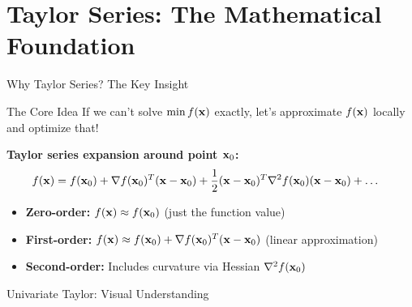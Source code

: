 \documentclass[usenames,dvipsnames]{beamer}
\begin{document}
  \section{Taylor Series: The Mathematical Foundation}

  \begin{frame}{Why Taylor Series? The Key Insight}
    \begin{definitionbox}{The Core Idea}
    If we can't solve $\min f(\mathbf{x})$ exactly, let's approximate $f(\mathbf{x})$ locally and optimize that!
    \end{definitionbox}
    
    \pause
    \textbf{Taylor series expansion around point $\mathbf{x}_0$:}
    \begin{align}
        f(\mathbf{x}) &= f(\mathbf{x}_0) + \nabla f(\mathbf{x}_0)^T(\mathbf{x}-\mathbf{x}_0) + \frac{1}{2}(\mathbf{x}-\mathbf{x}_0)^T\nabla^2 f(\mathbf{x}_0)(\mathbf{x}-\mathbf{x}_0) + \ldots
    \end{align}
    
    \pause
    \begin{itemize}[<+->]
        \item \textbf{Zero-order:} $f(\mathbf{x}) \approx f(\mathbf{x}_0)$ (just the function value)
        \item \textbf{First-order:} $f(\mathbf{x}) \approx f(\mathbf{x}_0) + \nabla f(\mathbf{x}_0)^T(\mathbf{x}-\mathbf{x}_0)$ (linear approximation)
        \item \textbf{Second-order:} Includes curvature via Hessian $\nabla^2 f(\mathbf{x}_0)$
    \end{itemize}
  \end{frame}

  \begin{frame}{Univariate Taylor: Visual Understanding}
    \begin{center}
    \end{center}
  \end{frame}
\end{document}
